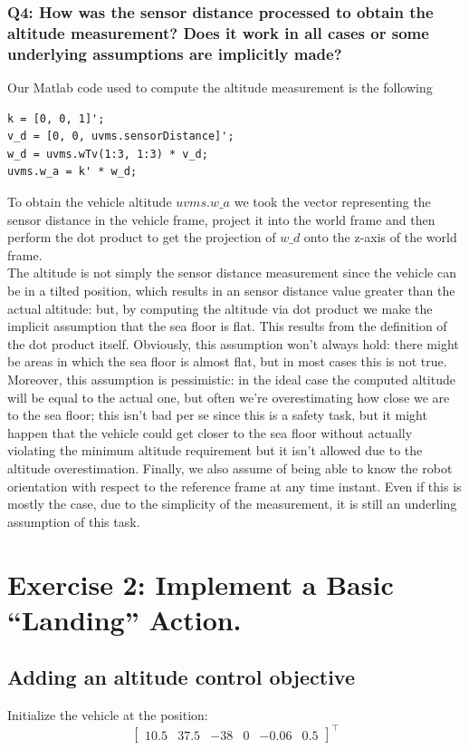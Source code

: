 \documentclass{article}
\begin{document}
\subsubsection{Q4: How was the sensor distance processed to obtain the altitude measurement? Does it work in all cases or some underlying assumptions are implicitly made?}
Our Matlab code used to compute the altitude measurement is the following
\begin{lstlisting}
k = [0, 0, 1]';
v_d = [0, 0, uvms.sensorDistance]';
w_d = uvms.wTv(1:3, 1:3) * v_d;
uvms.w_a = k' * w_d;
\end{lstlisting}
To obtain the vehicle altitude $ uvms.w\_a $ we took the vector representing the sensor distance in the vehicle frame, project it into the world frame and then perform the dot product to get the projection of $ w\_d $ onto the z-axis of the world frame. \\

The altitude is not simply the sensor distance measurement since the vehicle can be in a tilted position, which results in an sensor distance value greater than the actual altitude: but, by computing the altitude via dot product we make the implicit assumption that the sea floor is flat. This results from the definition of the dot product itself. Obviously, this assumption won't always hold: there might be areas in which the sea floor is almost flat, but in most cases this is not true. \\

Moreover, this assumption is pessimistic: in the ideal case the computed altitude will be equal to the actual one, but often we're overestimating how close we are to the sea floor; this isn't bad per se since this is a safety task, but it might happen that the vehicle could get closer to the sea floor without actually violating the minimum altitude requirement but it isn't allowed due to the altitude overestimation.
Finally, we also assume of being able to know the robot orientation with respect to the reference frame at any time instant. Even if this is mostly the case, due to the simplicity of the measurement, it is still an underling assumption of this task. 

\clearpage



\section{Exercise 2: Implement a Basic “Landing” Action.}
\subsection{Adding an altitude control objective}
Initialize the vehicle at the position:
\begin{displaymath}
\begin{bmatrix} 10.5 & 37.5 & -38 & 0 & -0.06 & 0.5 \end{bmatrix}^\top
\end{displaymath}
\end{document}
